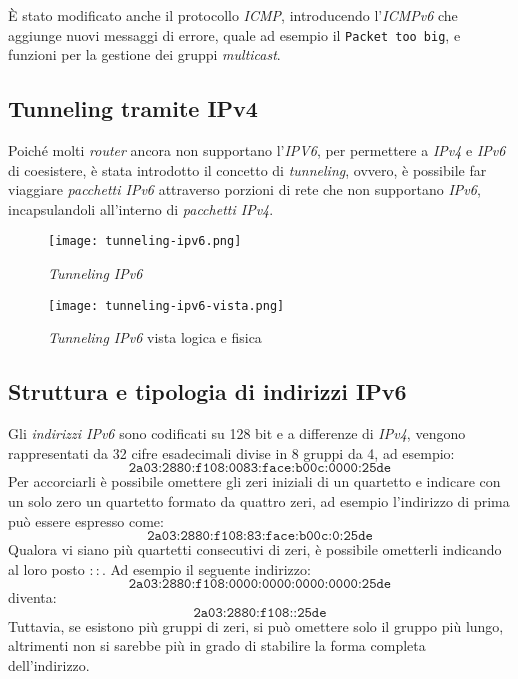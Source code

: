 \begin{note}
    È stato modificato anche il protocollo \emph{ICMP}, introducendo l'\emph{ICMPv6}
    che aggiunge nuovi messaggi di errore, quale ad esempio il \texttt{Packet too
    big}, e funzioni per la gestione dei gruppi \emph{multicast}.
\end{note}

\subsection{Tunneling tramite IPv4}
Poiché molti \emph{router} ancora non supportano l'\emph{IPV6}, per permettere a
\emph{IPv4} e \emph{IPv6} di coesistere, è stata introdotto il concetto di
\emph{tunneling}, ovvero, è possibile far viaggiare \emph{pacchetti IPv6}
attraverso porzioni di rete che non supportano \emph{IPv6}, incapsulandoli
all'interno di \emph{pacchetti IPv4}.

\begin{figure}[ht]
    \centering
    \texttt{[image: tunneling-ipv6.png]}
    \caption{\emph{Tunneling IPv6}}
\end{figure}
\begin{figure}[ht!]
    \centering
    \texttt{[image: tunneling-ipv6-vista.png]}
    \caption{\emph{Tunneling IPv6} vista logica e fisica}
\end{figure}

\newpage
\subsection{Struttura e tipologia di indirizzi IPv6}
Gli \emph{indirizzi IPv6} sono codificati su 128 bit e a differenze di
\emph{IPv4}, vengono rappresentati da 32 cifre esadecimali divise in 8 gruppi
da 4, ad esempio:
\[\texttt{2a03:2880:f108:0083:face:b00c:0000:25de}\]
Per accorciarli è possibile omettere gli zeri iniziali di un quartetto e indicare
con un solo zero un quartetto formato da quattro zeri, ad esempio l'indirizzo di
prima può essere espresso come:
\[\texttt{2a03:2880:f108:83:face:b00c:0:25de}\]
Qualora vi siano più quartetti consecutivi di zeri, è possibile ometterli
indicando al loro posto $::$. Ad esempio il seguente indirizzo:
\[\texttt{2a03:2880:f108:0000:0000:0000:0000:25de}\]
diventa:
\[\texttt{2a03:2880:f108::25de}\]
Tuttavia, se esistono più gruppi di zeri, si può omettere solo il gruppo
più lungo, altrimenti non si sarebbe più in grado di stabilire la forma completa
dell'indirizzo.

